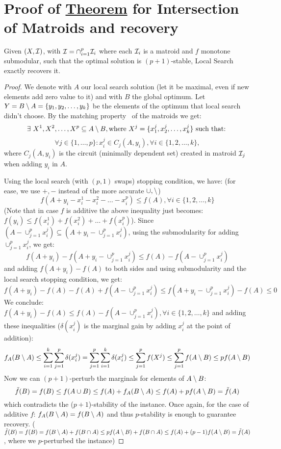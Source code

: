 \section{Proof of \hyperref[th:LSmatroids]{Theorem} for Intersection of Matroids and recovery}\label{app:LSrecovery}

\begin{theorem}
Given $(X,\mathcal{I})$, with $\mathcal{I}=\cap_{i=1}^p \mathcal{I}_i$ where each $\mathcal{I}_i$ is a matroid and $f$ monotone submodular, such that the optimal solution is $(p+1)$-stable, Local Search exactly recovers it.
\end{theorem}
\begin{proof}
We denote with $A$ our local search solution (let it be maximal, even if new elements add zero value to it) and with $B$ the global optimum. Let $Y=B\setminus A=\{y_1,y_2,\dots,y_k\}$ be the elements of the optimum that local search didn't choose. By the matching property~\cite{reichel2007evolutionary} of the matroids we get:
\[
\exists\ X^1,X^2,\dots,X^p \subseteq A\setminus B, \text{where\ } X^j=\{x_1^j,x_2^j,\dots,x_k^j\}\  \text{such that:\ }
\]
\[
\forall j\in\{1,\dots,p\}: x_i^j \in C_j(A,y_i), \forall i\in \{1,2,\dots,k\},
\]
where $C_j(A,y_i)$ is the circuit (minimally dependent set) created in matroid $\mathcal{I}_j$ when adding $y_i$ in $A$.

Using the local search (with $(p,1)$ swaps) stopping condition, we have: (for ease, we use $+,-$ instead of the more accurate $\cup, \setminus$)
\[
f(A+y_i-x_i^1-x_i^2-\dots-x_i^p)\le f(A), \forall i\in \{1,2,\dots,k\}
\]
(Note that in case $f$ is additive the above inequality just becomes: $f(y_i)\le f(x_i^1)+f(x_i^2)+\dots+f(x_i^p)$).
Since $(A-\cup_{j=1}^p x^j_i)\subseteq (A+y_i-\cup_{j=1}^p x^j_i)$, using the submodularity for adding $\cup_{j=1}^p x^j_i$, we get:
\[
f(A+y_i)-f(A+y_i-\cup_{j=1}^p x^j_i)\le f(A)-f(A-\cup_{j=1}^p x^j_i)
\]
and adding $f(A+y_i)-f(A)$ to both sides and using submodularity and the local search stopping condition, we get:
\[
f(A+y_i)-f(A)-f(A)+f(A-\cup_{j=1}^p x^j_i)\le f(A+y_i-\cup_{j=1}^p x^j_i)-f(A)\le 0
\]
We conclude: $f(A+y_i)-f(A)\le f(A)-f(A-\cup_{j=1}^p x^j_i), \forall i\in \{1,2,\dots,k\}$ and adding these inequalities ($\delta(x_i^j)$ is the marginal gain by adding $x_i^j$ at the point of addition):
\[
f_A(B\setminus A)\le \sum_{i=1}^k\sum_{j=1}^p\delta(x_i^j) = \sum_{j=1}^p\sum_{i=1}^k\delta(x_i^j)\le \sum_{j=1}^p f(X^j)\le \sum_{j=1}^p f(A\setminus B)\le pf(A\setminus B)
\]
Now we can $(p+1)$-perturb the marginals for elements of $A\setminus B$:
\[
\tilde{f}(B)=f(B)\le f(A\cup B)\le f(A)+f_A(B\setminus A)\le f(A)+pf(A\setminus B)=\tilde{f}(A)
\]
which contradicts the ($p+1$)-stability of the instance. Once again, for the case of additive $f$: $f_A(B\setminus A)=f(B\setminus A)$ and thus $p$-stability is enough to guarantee recovery. ($\tilde{f}(B)=f(B)=f(B\setminus A)+f(B\cap A)\le pf(A\setminus B) +f(B\cap A)\le f(A)+(p-1)f(A\setminus B)=\tilde{f}(A)$, where we $p$-perturbed the instance)
\end{proof}




















